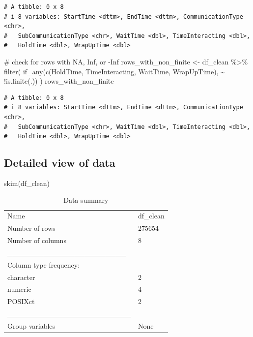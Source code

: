 \documentclass[
  letterpaper,
  DIV=11,
  numbers=noendperiod]{scrartcl}
\newenvironment{Shaded}{\begin{snugshade}}{\end{snugshade}}
\newcommand{\CommentTok}[1]{\textcolor[rgb]{0.37,0.37,0.37}{#1}}
\newcommand{\FunctionTok}[1]{\textcolor[rgb]{0.28,0.35,0.67}{#1}}
\newcommand{\NormalTok}[1]{\textcolor[rgb]{0.00,0.23,0.31}{#1}}
\newcommand{\OtherTok}[1]{\textcolor[rgb]{0.00,0.23,0.31}{#1}}
\newcommand{\SpecialCharTok}[1]{\textcolor[rgb]{0.37,0.37,0.37}{#1}}
\begin{document}
\begin{verbatim}
# A tibble: 0 x 8
# i 8 variables: StartTime <dttm>, EndTime <dttm>, CommunicationType <chr>,
#   SubCommunicationType <chr>, WaitTime <dbl>, TimeInteracting <dbl>,
#   HoldTime <dbl>, WrapUpTime <dbl>
\end{verbatim}

\begin{Shaded}
\begin{Highlighting}[]
\CommentTok{\# check for rows with NA, Inf, or {-}Inf}
\NormalTok{rows\_with\_non\_finite }\OtherTok{\textless{}{-}}\NormalTok{ df\_clean }\SpecialCharTok{\%\textgreater{}\%}
  \FunctionTok{filter}\NormalTok{(}
    \FunctionTok{if\_any}\NormalTok{(}\FunctionTok{c}\NormalTok{(HoldTime, TimeInteracting, WaitTime, WrapUpTime), }\SpecialCharTok{\textasciitilde{}} \SpecialCharTok{!}\FunctionTok{is.finite}\NormalTok{(.))}
\NormalTok{  )}
\NormalTok{rows\_with\_non\_finite}
\end{Highlighting}
\end{Shaded}

\begin{verbatim}
# A tibble: 0 x 8
# i 8 variables: StartTime <dttm>, EndTime <dttm>, CommunicationType <chr>,
#   SubCommunicationType <chr>, WaitTime <dbl>, TimeInteracting <dbl>,
#   HoldTime <dbl>, WrapUpTime <dbl>
\end{verbatim}

\subsection{Detailed view of data}\label{detailed-view-of-data}

\begin{Shaded}
\begin{Highlighting}[]
\FunctionTok{skim}\NormalTok{(df\_clean)}
\end{Highlighting}
\end{Shaded}

\begin{longtable}[]{@{}ll@{}}
\caption{Data summary}\tabularnewline
\toprule\noalign{}
\endfirsthead
\endhead
\bottomrule\noalign{}
\endlastfoot
Name & df\_clean \\
Number of rows & 275654 \\
Number of columns & 8 \\
\_\_\_\_\_\_\_\_\_\_\_\_\_\_\_\_\_\_\_\_\_\_\_ & \\
Column type frequency: & \\
character & 2 \\
numeric & 4 \\
POSIXct & 2 \\
\_\_\_\_\_\_\_\_\_\_\_\_\_\_\_\_\_\_\_\_\_\_\_\_ & \\
Group variables & None \\
\end{longtable}
\end{document}
